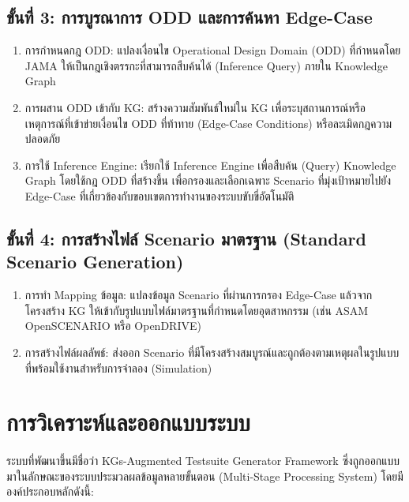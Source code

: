 \subsection{ขั้นที่ 3: การบูรณาการ ODD และการค้นหา Edge-Case}\label{subsec:ch4_odd_integration}

\begin{enumerate}
    \item การกำหนดกฎ ODD: แปลงเงื่อนไข Operational Design Domain (ODD) ที่กำหนดโดย JAMA ให้เป็นกฎเชิงตรรกะที่สามารถสืบค้นได้ (Inference Query) ภายใน Knowledge Graph
    \item การผสาน ODD เข้ากับ KG: สร้างความสัมพันธ์ใหม่ใน KG เพื่อระบุสถานการณ์หรือเหตุการณ์ที่เข้าข่ายเงื่อนไข ODD ที่ท้าทาย (Edge-Case Conditions) หรือละเมิดกฎความปลอดภัย
    \item การใช้ Inference Engine: เรียกใช้ Inference Engine เพื่อสืบค้น (Query) Knowledge Graph โดยใช้กฎ ODD ที่สร้างขึ้น เพื่อกรองและเลือกเฉพาะ Scenario ที่มุ่งเป้าหมายไปยัง Edge-Case ที่เกี่ยวข้องกับขอบเขตการทำงานของระบบขับขี่อัตโนมัติ
\end{enumerate}

\subsection{ขั้นที่ 4: การสร้างไฟล์ Scenario มาตรฐาน (Standard Scenario Generation)}\label{subsec:ch4_scenario_generation}

\begin{enumerate}
    \item การทำ Mapping ข้อมูล: แปลงข้อมูล Scenario ที่ผ่านการกรอง Edge-Case แล้วจากโครงสร้าง KG ให้เข้ากับรูปแบบไฟล์มาตรฐานที่กำหนดโดยอุตสาหกรรม (เช่น ASAM OpenSCENARIO หรือ OpenDRIVE)
    \item การสร้างไฟล์ผลลัพธ์: ส่งออก Scenario ที่มีโครงสร้างสมบูรณ์และถูกต้องตามเหตุผลในรูปแบบที่พร้อมใช้งานสำหรับการจำลอง (Simulation)
\end{enumerate}

\section{การวิเคราะห์และออกแบบระบบ}\label{sec:ch4_system_design}
\paragraph{}

ระบบที่พัฒนาขึ้นมีชื่อว่า KGs-Augmented Testsuite Generator Framework ซึ่งถูกออกแบบมาในลักษณะของระบบประมวลผลข้อมูลหลายขั้นตอน (Multi-Stage Processing System) โดยมีองค์ประกอบหลักดังนี้:

